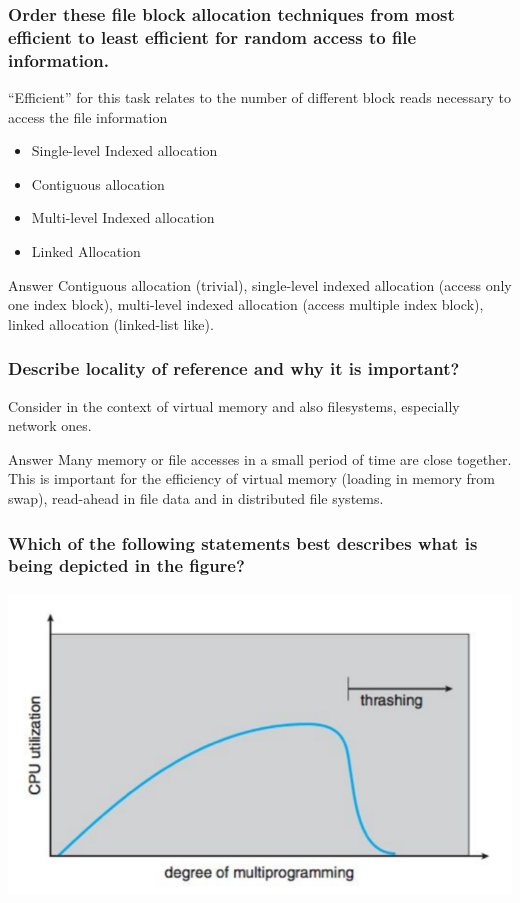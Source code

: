 \documentclass{beamer}
\begin{document}
\begin{frame}
  \frametitle{Order these file block allocation techniques from most efficient to least efficient for random access to file information.}
  “Efficient” for this task relates to the number of different block reads necessary to access the file information
  \begin{itemize}
    \item Single-level Indexed allocation
    \item Contiguous allocation
    \item Multi-level Indexed allocation
    \item Linked Allocation
  \end{itemize}
  \pause
  \begin{block}{Answer}
    Contiguous allocation (trivial), single-level indexed allocation (access only one index block), multi-level indexed allocation (access multiple index block), linked allocation (linked-list like).
  \end{block}
\end{frame}
\begin{frame}
  \frametitle{Describe locality of reference and why it is important?}
  Consider in the context of virtual memory and also filesystems, especially network ones.
  \pause
  \begin{block}{Answer}
    Many memory or file accesses in a small period of time are close together. This is important for the efficiency of virtual memory (loading in memory from swap), read-ahead in file data and in distributed file systems.
  \end{block}
\end{frame}
\begin{frame}
  \frametitle{Which of the following statements best describes what is being depicted in the figure?}
  \includegraphics[width=\textwidth,height=0.8\textheight,keepaspectratio]{images/thrashing.png}
\end{frame}
\end{document}
